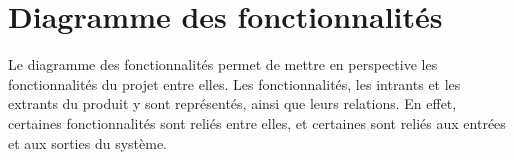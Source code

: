 \chapter{Diagramme des fonctionnalités}

Le diagramme des fonctionnalités permet de mettre en perspective les fonctionnalités du projet entre elles. Les fonctionnalités, les intrants et les extrants du produit y sont représentés, ainsi que leurs relations. En effet, certaines fonctionnalités sont reliés entre elles, et certaines sont reliés aux entrées et aux sorties du système.